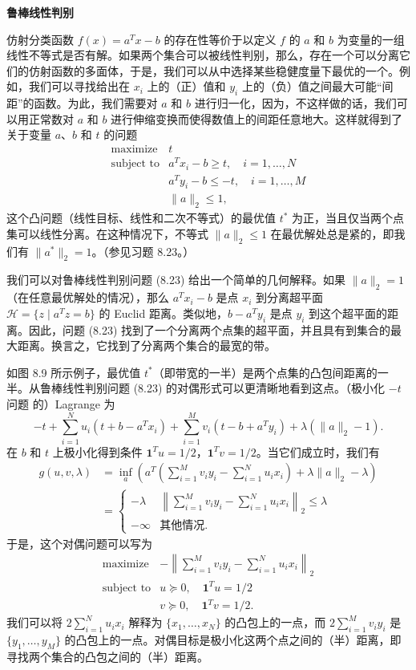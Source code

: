 \documentclass[UTF8, 12pt, fontset=fandol, oneside]{ctexart}
\begin{document}
\noindent\textbf{鲁棒线性判别}

仿射分类函数 $f(x)=a^Tx-b$ 的存在性等价于以定义 $f$ 的 $a$ 和 $b$ 为变量的一组线性不等式是否有解。如果两个集合可以被线性判别，那么，存在一个可以分离它们的仿射函数的多面体，于是，我们可以从中选择某些稳健度量下最优的一个。例如，我们可以寻找给出在 $x_i$ 上的（正）值和 $y_i$ 上的（负）值之间最大可能“间距”的函数。为此，我们需要对 $a$ 和 $b$ 进行归一化，因为，不这样做的话，我们可以用正常数对 $a$ 和 $b$ 进行伸缩变换而使得数值上的间距任意地大。这样就得到了关于变量 $a$、$b$ 和 $t$ 的问题
\[
\begin{array}{ll}
\mbox{maximize} & t\\
\mbox{subject to} & a^Tx_i-b\geq t,\quad i=1,\ldots,N\\
& a^Ty_i-b\leq -t,\quad i=1,\ldots,M\\
& \|a\|_2\leq 1,
\end{array}
\tag{8.23}
\]
这个凸问题（线性目标、线性和二次不等式）的最优值 $t^*$ 为正，当且仅当两个点集可以线性分离。在这种情况下，不等式 $\|a\|_2\leq 1$ 在最优解处总是紧的，即我们有 $\|a^*\|_2=1$。（参见习题 8.23。）

我们可以对鲁棒线性判别问题 (8.23) 给出一个简单的几何解释。如果 $\|a\|_2=1$（在任意最优解处的情况），那么 $a^Tx_i-b$ 是点 $x_i$ 到分离超平面 $\mathcal{H}=\{z\mid a^Tz=b\}$ 的 Euclid 距离。类似地，$b-a^Ty_i$ 是点 $y_i$ 到这个超平面的距离。因此，问题 (8.23) 找到了一个分离两个点集的超平面，并且具有到集合的最大距离。换言之，它找到了分离两个集合的最宽的带。

如图 8.9 所示例子，最优值 $t^*$（即带宽的一半）是两个点集的凸包间距离的一半。从鲁棒线性判别问题 (8.23) 的对偶形式可以更清晰地看到这点。（极小化 $-t$ 问题
的）Lagrange 为
\[
-t+\sum_{i=1}^N u_i(t+b-a^Tx_i)+\sum_{i=1}^M v_i(t-b+a^Ty_i)+\lambda(\|a\|_2-1).
\]
在 $b$ 和 $t$ 上极小化得到条件 $\mathbf{1}^Tu=1/2$，$\mathbf{1}^Tv=1/2$。当它们成立时，我们有
\[
\begin{split}
g(u,v,\lambda)
&=\inf_a\left(a^T\left(\sum_{i=1}^M v_i y_i-\sum_{i=1}^N u_i x_i\right)+\lambda\|a\|_2-\lambda\right)\\
&=
\begin{cases}
-\lambda & \left\|\displaystyle\sum_{i=1}^M v_i y_i-\sum_{i=1}^N u_i x_i\right\|_2\leq \lambda\\
-\infty & \mbox{其他情况}.
\end{cases}
\end{split}
\]
于是，这个对偶问题可以写为
\[
\begin{array}{ll}
\mbox{maximize} & -\left\|\displaystyle\sum_{i=1}^M v_i y_i-\sum_{i=1}^N u_i x_i\right\|_2\\
\mbox{subject to} & u\succeq 0,\quad \mathbf{1}^Tu=1/2\\
& v\succeq 0,\quad \mathbf{1}^Tv=1/2.
\end{array}
\]
我们可以将 $2\sum_{i=1}^N u_i x_i$ 解释为 $\{x_1,\ldots,x_N\}$ 的凸包上的一点，而 $2\sum_{i=1}^M v_i y_i$ 是 $\{y_1,\ldots,y_M\}$ 的凸包上的一点。对偶目标是极小化这两个点之间的（半）距离，即寻找两个集合的凸包之间的（半）距离。
\end{document}
